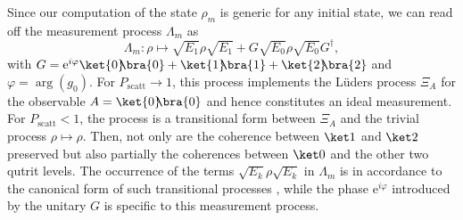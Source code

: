 \documentclass[12pt,
onecolumn,
superscriptaddress,
floatfix,
]{revtex4-2}
\newcommand{\ee}{{\mathrm e}}
\newcommand{\ketbra}[2]{{\ket{#1}\!\!\bra{#2}}}
\newcommand{\proj}[1]{{\ketbra{#1}{#1}}}
\begin{document}
Since our computation of the state $\rho_m$ is generic for any 
 initial state, we can read off the measurement process $\Lambda_m$ as
%
\begin{equation}\label{eq:lambdam}
 \Lambda_m\colon \rho\mapsto \sqrt{E_1}\rho\sqrt{E_1}
               +G\sqrt{E_0}\rho\sqrt{E_0}G^\dag,
\end{equation}
%
 with $G= \ee^{i \varphi} \proj 0+\proj 1+\proj 2$ and $\varphi=\arg(g_0)$.
For $P_\mathrm{scatt}\rightarrow 1$, this process implements the Lüders process 
 $\Xi_A$ for the observable $A= \proj 0$ and hence constitutes an ideal 
 measurement.
For $P_\mathrm{scatt}<1$, the process is a transitional form between $\Xi_A$ 
 and the trivial process $\rho\mapsto \rho$.
Then, not only are the coherence between $\ket1$ and $\ket2$ preserved but also 
 partially the coherences between $\ket0$ and the other two qutrit levels.
The occurrence of the terms $\sqrt{E_k}\rho\sqrt{E_k}$ in $\Lambda_m$ 
 is in accordance to the canonical form of such transitional processes 
 \cite{Heinosaari12}, while the phase $\ee^{i\varphi}$ introduced by the 
 unitary $G$ is specific to this measurement process.
\end{document}
